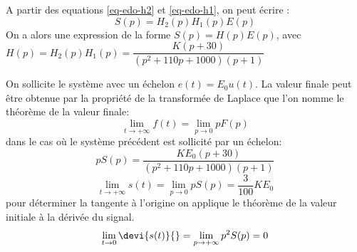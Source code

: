 \begin{center}
\end{center}
A partir des equations \ref{eq-edo-h2} et \ref{eq-edo-h1}, on peut écrire :
\[
    S(p) = H_2(p) H_1(p) E(p)
\]
On a alors une expression de la forme $S(p) =H(p) E(p)$,
avec $H(p)=H_2(p) H_1(p)=\dfrac{K(p+30)}{(p^2+110p+1000)(p+1)}$
\begin{center}
\end{center}
On sollicite le système avec un échelon $e(t)=E_0 u(t)$.
La valeur finale peut être obtenue par la propriété de la transformée
de Laplace que l'on nomme le théorème de la valeur finale:
\[
\lim\limits_{t \rightarrow +\infty} f(t) = \lim\limits_{p \rightarrow 0} pF(p)
\]
dans le cas où le système précédent est sollicité par un échelon:
\[
pS(p)=\dfrac{KE_0(p+30)}{(p^2+110p+1000)(p+1)}
\]
\[
\lim\limits_{t \rightarrow +\infty} s(t) = \lim\limits_{p \rightarrow 0} pS(p)
                                         = \dfrac{3}{100}KE_0
\]
pour déterminer la tangente à l'origine on applique le théorème de la valeur
initiale à la dérivée du signal.
\[
\lim\limits_{t \rightarrow 0} \devi{s(t)}{} =
\lim\limits_{p \rightarrow +\infty} p^2S(p)= 0
\]
